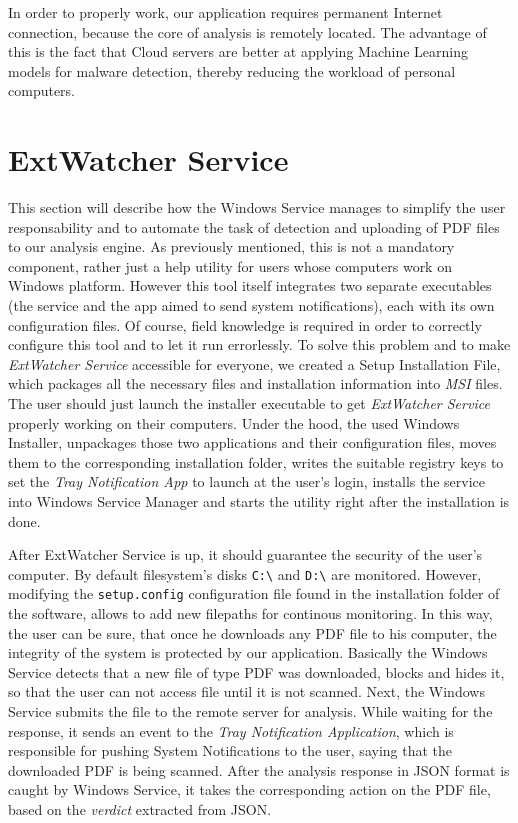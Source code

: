 In order to properly work, our application requires permanent Internet connection, because the core of analysis is remotely located. The advantage of this is the fact that Cloud servers are better at applying Machine Learning models for malware detection, thereby reducing the workload of personal computers. 


\section{ExtWatcher Service}
\label{section:winService}
This section will describe how the Windows Service manages to simplify the user responsability and to automate the task of detection and uploading of PDF files to our analysis engine. As previously mentioned, this is not a mandatory component, rather just a help utility for users whose computers work on Windows platform. However this tool itself integrates two separate executables (the service and the app aimed to send system notifications), each with its own configuration files. Of course, field knowledge is required in order to correctly configure this tool and to let it run errorlessly. To solve this problem and to make \textit{ExtWatcher Service} accessible for everyone, we created a Setup Installation File, which packages all the necessary files and installation information into \textit{MSI} files. The user should just launch the installer executable to get \textit{ExtWatcher Service} properly working on their computers. Under the hood, the used Windows Installer, unpackages those two applications and their configuration files, moves them to the corresponding installation folder, writes the suitable registry keys to set the \textit{Tray Notification App} to launch at the user's login, installs the service into Windows Service Manager and starts the utility right after the installation is done. \par
After ExtWatcher Service is up, it should guarantee the security of the user's computer. By default filesystem's disks \texttt{C:\textbackslash} and \texttt{D:\textbackslash} are monitored. However, modifying the \texttt{setup.config} configuration file found in the installation folder of the software, allows to add new filepaths for continous monitoring. In this way, the user can be sure, that once he downloads any PDF file to his computer, the integrity of the system is protected by our application. Basically the Windows Service detects that a new file of type PDF was downloaded, blocks and hides it, so that the user can not access file until it is not scanned. Next, the Windows Service submits the file to the remote server for analysis. While waiting for the response, it sends an event to the \textit{Tray Notification Application}, which is responsible for pushing System Notifications to the user, saying that the downloaded PDF is being scanned. After the analysis response in JSON format is caught by Windows Service, it takes the corresponding action on the PDF file, based on the \textit{verdict} extracted from JSON. 


